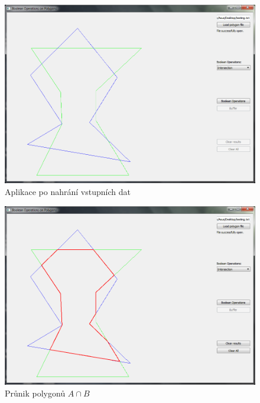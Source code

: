 \documentclass[a4paper, 12pt]{article}
\begin{document}
\begin{figure}[t]
	\centering
	\includegraphics[width=14.5cm]{./pictures/app_load_data.png}
	\caption{Aplikace po nahrání vstupních dat}
\end{figure}
\vspace{2cm}

\begin{figure}[b]
	\centering
	\includegraphics[width=14.5cm]{./pictures/app_intersection.png}
	\caption{Průnik polygonů $A \cap B$}
\end{figure}
\end{document}
